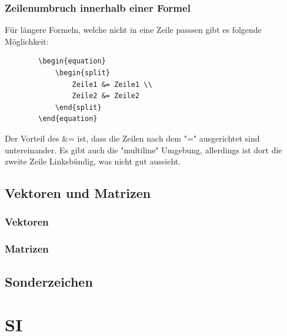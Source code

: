 	\subsubsection{Zeilenumbruch innerhalb einer Formel}
	Für längere Formeln, welche nicht in eine Zeile passsen gibt es folgende Möglichkeit:
	\begin{verbatim}
		\begin{equation} 
			\begin{split} 
				Zeile1 &= Zeile1 \\ 
				Zeile2 &= Zeile2
			\end{split} 
		\end{equation} 
	\end{verbatim}
	Der Vorteil des \&= ist, dass die Zeilen nach dem "=" ausgerichtet sind untereinander. Es gibt auch die "multiline" Umgebung, allerdings ist dort die zweite Zeile Linksbündig, was nicht gut aussieht.
	
	\subsection{Vektoren und Matrizen}
	\subsubsection{Vektoren}
	\subsubsection{Matrizen}
	
	\subsection{Sonderzeichen}
	
	
	
	\newpage
	\section{SI}
	
	
	
	
	\newpage
